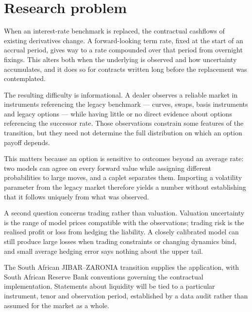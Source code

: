 \documentclass[12pt,final]{article}
\begin{document}
	

	\clearpage

	\section{Research problem}

	When an interest-rate benchmark is replaced, the contractual cashflows of
	existing derivatives change. A forward-looking term rate, fixed at the start
	of an accrual period, gives way to a rate compounded over that period from
	overnight fixings. This alters both when the underlying is observed and how
	uncertainty accumulates, and it does so for contracts written long before the
	replacement was contemplated.

	The resulting difficulty is informational. A dealer observes a reliable
	market in instruments referencing the legacy benchmark --- curves, swaps,
	basis instruments and legacy options --- while having little or no direct
	evidence about options referencing the successor rate. Those observations
	constrain some features of the transition, but they need not determine the
	full distribution on which an option payoff depends.

	This matters because an option is sensitive to outcomes beyond an average
	rate: two models can agree on every forward value while assigning different
	probabilities to large moves, and a caplet separates them. Importing a
	volatility parameter from the legacy market therefore yields a number without
	establishing that it follows uniquely from what was observed.

	A second question concerns trading rather than valuation. Valuation
	uncertainty is the range of model prices compatible with the observations;
	trading risk is the realised profit or loss from hedging the liability. A
	closely calibrated model can still produce large losses when trading
	constraints or changing dynamics bind, and small average hedging error says
	nothing about the upper tail.

	The South African JIBAR--ZARONIA transition supplies the application, with
	South African Reserve Bank conventions \citep{sarb2024conv} governing the
	contractual implementation. Statements about liquidity will be tied to a
	particular instrument, tenor and observation period, established by a data
	audit rather than assumed for the market as a whole.
\end{document}
